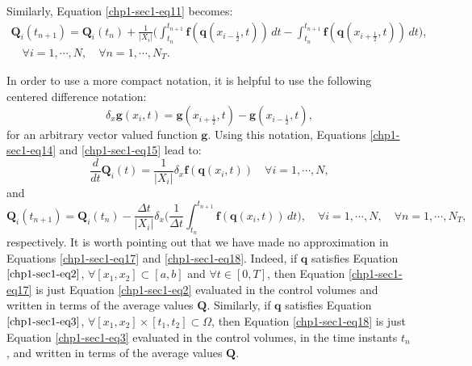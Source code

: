 Similarly, Equation \eqref{chp1-sec1-eq11} becomes:
\begin{equation}
        \label{chp1-sec1-eq15}
	\begin{aligned}
		\mathbf{Q}_i(t_{n+1}) =  \mathbf{Q}_i(t_n) +
		\frac{1}{|X_i|}\bigg( \int_{t_n}^{t_{n+1}}
        	\mathbf{f}(\mathbf{q}(x_{i-\frac{1}{2}}, t)) \,dt -
		\int_{t_n}^{t_{n+1}}\mathbf{f}(\mathbf{q}(x_{i+\frac{1}{2}}, t)) \,dt \bigg),
       		\\
		\quad \forall i = 1, \cdots, N,
		\quad \forall n = 1, \cdots, N_T.
	\end{aligned}
\end{equation}

In order to use a more compact notation, it is helpful to use the following centered difference notation:
\begin{equation}
	\label{chp1-sec1-eq16}
	\delta_x \mathbf{g}(x_i,t) = 
	\mathbf{g}(x_{i+\frac{1}{2}},t) - 
	\mathbf{g}(x_{i-\frac{1}{2}},t),
\end{equation}
for an arbitrary vector valued function $\mathbf{g}$. 
Using this notation, Equations \eqref{chp1-sec1-eq14}
and \eqref{chp1-sec1-eq15} lead to:
\begin{equation}
        \label{chp1-sec1-eq17}
        \frac{d}{dt} \mathbf{Q}_i(t) = \frac{1}{|X_i|}
	\delta_x \mathbf{f}(\mathbf{q}(x_{i},t))
        \quad \forall i = 1, \cdots, N,
\end{equation}
and
\begin{equation}
        \label{chp1-sec1-eq18}
        \mathbf{Q}_i(t_{n+1}) =  \mathbf{Q}_i(t_n) -
	\frac{\Delta t}{|X_i|} \delta _x\bigg( \frac{1}{\Delta t}\int_{t_n}^{t_{n+1}}
        \mathbf{f}(\mathbf{q}(x_{i}, t)) \,dt \bigg),
        \quad \forall i = 1, \cdots, N,
        \quad \forall n = 1, \cdots, N_T,
\end{equation}
respectively.
It is worth pointing out that we have made no approximation in Equations
\eqref{chp1-sec1-eq17} and \eqref{chp1-sec1-eq18}. Indeed, if $\mathbf{q}$ satisfies Equation
$\eqref{chp1-sec1-eq2}$, $\forall [x_1, x_2] \subset [a,b]$ and $\forall t \in [0,T]$,
then Equation \eqref{chp1-sec1-eq17} is just Equation
\eqref{chp1-sec1-eq2} evaluated in the control volumes and written
in terms of the average values $\mathbf{Q}$. 
Similarly, if $\mathbf{q}$ satisfies Equation
$\eqref{chp1-sec1-eq3}$, $\forall [x_1, x_2] \times [t_1, t_2] \subset \Omega$,
then Equation \eqref{chp1-sec1-eq18} is just Equation
\eqref{chp1-sec1-eq3} evaluated in the control volumes, in the time instants $t_n$, and written
in terms of the average values $\mathbf{Q}$.

